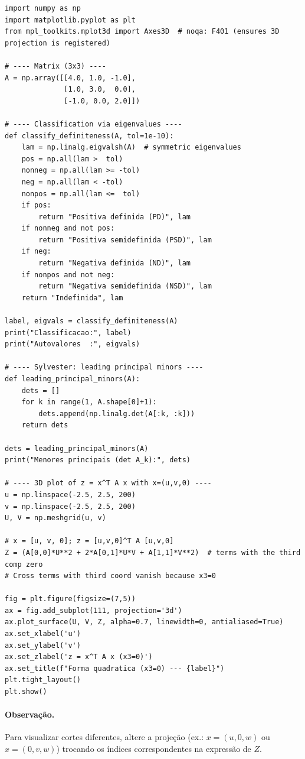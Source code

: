 \documentclass[9pt,a4paper]{extarticle}
\begin{document}
\begin{lstlisting}
import numpy as np
import matplotlib.pyplot as plt
from mpl_toolkits.mplot3d import Axes3D  # noqa: F401 (ensures 3D projection is registered)

# ---- Matrix (3x3) ----
A = np.array([[4.0, 1.0, -1.0],
              [1.0, 3.0,  0.0],
              [-1.0, 0.0, 2.0]])

# ---- Classification via eigenvalues ----
def classify_definiteness(A, tol=1e-10):
    lam = np.linalg.eigvalsh(A)  # symmetric eigenvalues
    pos = np.all(lam >  tol)
    nonneg = np.all(lam >= -tol)
    neg = np.all(lam < -tol)
    nonpos = np.all(lam <=  tol)
    if pos:
        return "Positiva definida (PD)", lam
    if nonneg and not pos:
        return "Positiva semidefinida (PSD)", lam
    if neg:
        return "Negativa definida (ND)", lam
    if nonpos and not neg:
        return "Negativa semidefinida (NSD)", lam
    return "Indefinida", lam

label, eigvals = classify_definiteness(A)
print("Classificacao:", label)
print("Autovalores  :", eigvals)

# ---- Sylvester: leading principal minors ----
def leading_principal_minors(A):
    dets = []
    for k in range(1, A.shape[0]+1):
        dets.append(np.linalg.det(A[:k, :k]))
    return dets

dets = leading_principal_minors(A)
print("Menores principais (det A_k):", dets)

# ---- 3D plot of z = x^T A x with x=(u,v,0) ----
u = np.linspace(-2.5, 2.5, 200)
v = np.linspace(-2.5, 2.5, 200)
U, V = np.meshgrid(u, v)

# x = [u, v, 0]; z = [u,v,0]^T A [u,v,0]
Z = (A[0,0]*U**2 + 2*A[0,1]*U*V + A[1,1]*V**2)  # terms with the third comp zero
# Cross terms with third coord vanish because x3=0

fig = plt.figure(figsize=(7,5))
ax = fig.add_subplot(111, projection='3d')
ax.plot_surface(U, V, Z, alpha=0.7, linewidth=0, antialiased=True)
ax.set_xlabel('u')
ax.set_ylabel('v')
ax.set_zlabel('z = x^T A x (x3=0)')
ax.set_title(f"Forma quadratica (x3=0) --- {label}")
plt.tight_layout()
plt.show()
\end{lstlisting}

\paragraph{Observa\c c\~ao.}
Para visualizar cortes diferentes, altere a proje\c c\~ao (ex.: $x=(u,0,w)$ ou $x=(0,v,w)$) trocando os \'indices correspondentes na express\~ao de $Z$.
\end{document}
